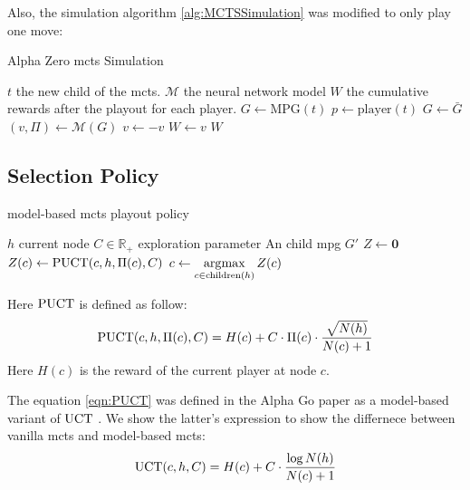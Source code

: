 Also, the simulation algorithm \ref{alg:MCTSSimulation} was modified to only play one move:

\begin{algorithm}[H]
	\caption{Alpha Zero \acrshort{mcts} Simulation}\label{alg:AZSimulation}
	\begin{algorithmic}
		\Require $t$ the new child of the \acrshort{mcts}.
		\Require $\mathcal{M}$ the neural network model
		\Ensure $W$ the cumulative rewards after the playout for each player.
		\State  $G\leftarrow \text{MPG}(t)$ 
		\State  $p\leftarrow \text{player}(t)$ 
			\State $G\leftarrow \bar{G}$
		\EndIf
		\State $(v,\Pi)\leftarrow \mathcal{M}(G)$
			\State $v\leftarrow -v$
		\EndIf
		\State $W\leftarrow v$
		\Return $W$
	\end{algorithmic}
\end{algorithm}
\FloatBarrier
\subsection{Selection Policy}
\label{section:RL:ModelBased:SelectionPolicy}
\begin{algorithm}[H]
	\caption{model-based \acrshort{mcts} playout policy}\label{alg:SelectionPolicy}
	\begin{algorithmic}
		\Require $h$ current node 
		\Require $C\in\mathbb{R}_+$ exploration parameter
		\Ensure An child \acrshort{mpg} $G'$
		\State $Z\leftarrow \boldsymbol{0}$
		\For {$c\in \text{children}(h)$}
			\State $Z(c)\leftarrow \operatorname{PUCT}(c,h,\Pi(c),C)$
		\EndFor
		\State \Return $\displaystyle c \leftarrow \operatorname*{\arg\!\max}_{c\in \text{children}(h)}Z(c)$
	\end{algorithmic}
\end{algorithm}
Here $\operatorname{PUCT}$ is defined as follow:
\begin{equation}
	\label{eqn:PUCT}
	\operatorname{PUCT}(c,h,\Pi(c),C) = H(c) + C\cdot \Pi(c) \cdot \frac{\sqrt{N(h)}}{N(c)+1}
\end{equation}
Here $H(c)$ is the reward of the current player at node $c$.

The equation \eqref{eqn:PUCT} was defined in the Alpha Go paper \cite{AlphaGo} as a model-based variant of $\operatorname{UCT}$ \cite{UCT}. We show the latter's expression to show the differnece between vanilla \acrshort{mcts} and model-based \acrshort{mcts}:
\begin{equation*}
	\operatorname{UCT}(c,h,C) =  H(c) + C\cdot \frac{\log {N(h)}}{N(c)+1}
\end{equation*}

